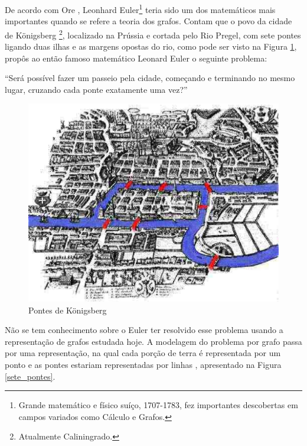 De acordo com Ore \cite{Ore:1963}, Leonhard Euler\footnote{Grande matemático e físico suíço, 1707-1783, fez importantes descobertas em campos variados como Cálculo e Grafos.} teria sido um dos matemáticos mais importantes quando se refere a teoria dos grafos. Contam que o povo da cidade de Königsberg \footnote{Atualmente Caliningrado.}, localizado na Prússia e cortada pelo Rio Pregel, com sete pontes ligando duas ilhas e as margens opostas do rio, como pode ser visto na Figura \ref{Konigsberg}, propôs ao então famoso matemático Leonard Euler o seguinte problema:

	``Será possível fazer um passeio pela cidade, começando e
	terminando no mesmo lugar, cruzando cada ponte exatamente uma vez?''

\begin{figure}[!h]
	\centering
	\includegraphics[scale=0.35]{figuras/capitulo2/Konigsberg.eps}
	\caption{Pontes de Königsberg}
	\label{Konigsberg}
\end{figure}

Não se tem conhecimento sobre o Euler ter resolvido esse problema usando a representação de grafos estudada hoje. A modelagem do problema por grafo passa por uma representação, na qual cada porção de terra  é representada por um ponto e as pontes estariam representadas por linhas \cite{Ore:1963}, apresentado na Figura \ref{sete_pontes}.

